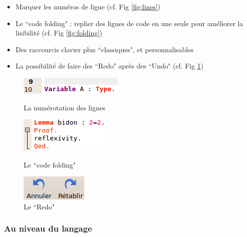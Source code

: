             \begin{itemize}
                \item Marquer les numéros de ligne (cf. Fig \ref{fig:lines})
                \item Le ``code folding" : replier des lignes de code en une seule pour améliorer la lisibilité (cf. Fig \ref{fig:folding})
                \item Des raccourcis clavier plus ``classiques", et personnalisables
                \item La possibilité de faire des ``Redo" après des ``Undo" (cf. Fig \ref{fig:redo})
            \end{itemize}
            \begin{figure}[ht]
                \begin{minipage}[b]{0.3\linewidth}
                    \centering
                    \includegraphics[scale=0.5]{ide_images/lines.png}
                    \caption{La numérotation des lignes}
                    \label{fig:lines}
                \end{minipage}
                \hfill
                \begin{minipage}[b]{0.3\linewidth}   
	                \centering
	                \includegraphics[scale=0.5]{ide_images/folding.png}
	                \caption{Le ``code folding"}
	                \label{fig:folding}
                \end{minipage}
                \hfill
                \begin{minipage}[b]{0.3\linewidth}   
	                \centering
	                \includegraphics[scale=0.5]{ide_images/redo.png}
	                \caption{Le ``Redo"}
	                \label{fig:redo}
	            \end{minipage}
            \end{figure}
            
        \subsubsection{Au niveau du langage}

